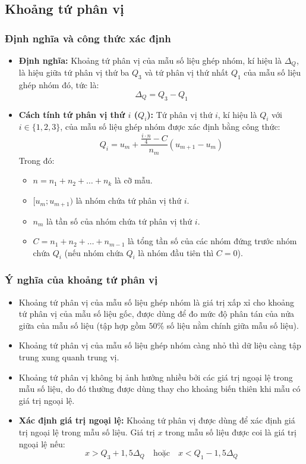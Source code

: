 \documentclass[12pt]{article}
\begin{document}
	
	\subsection{Khoảng tứ phân vị}
	
	\subsubsection{Định nghĩa và công thức xác định}
	\begin{itemize}
		\item \textbf{Định nghĩa:} Khoảng tứ phân vị của mẫu số liệu ghép nhóm, kí hiệu là $\Delta_Q$, là hiệu giữa tứ phân vị thứ ba $Q_3$ và tứ phân vị thứ nhất $Q_1$ của mẫu số liệu ghép nhóm đó, tức là:
		\[ \Delta_Q = Q_3 - Q_1 \]
		
		\item \textbf{Cách tính tứ phân vị thứ $i$ ($Q_i$):} Tứ phân vị thứ $i$, kí hiệu là $Q_i$ với $i \in \{1, 2, 3\}$, của mẫu số liệu ghép nhóm được xác định bằng công thức:
		\[ Q_i = u_m + \frac{\frac{i \cdot n}{4} - C}{n_m}(u_{m+1} - u_m) \]
		Trong đó:
		\begin{itemize}
			\item $n = n_1 + n_2 + \dots + n_k$ là cỡ mẫu.
			\item $[u_m; u_{m+1})$ là nhóm chứa tứ phân vị thứ $i$.
			\item $n_m$ là tần số của nhóm chứa tứ phân vị thứ $i$.
			\item $C = n_1 + n_2 + \dots + n_{m-1}$ là tổng tần số của các nhóm đứng trước nhóm chứa $Q_i$ (nếu nhóm chứa $Q_i$ là nhóm đầu tiên thì $C = 0$).
		\end{itemize}
	\end{itemize}
	
	\subsubsection{Ý nghĩa của khoảng tứ phân vị}
	\begin{itemize}
		\item Khoảng tứ phân vị của mẫu số liệu ghép nhóm là giá trị xấp xỉ cho khoảng tứ phân vị của mẫu số liệu gốc, được dùng để đo mức độ phân tán của nửa giữa của mẫu số liệu (tập hợp gồm $50\%$ số liệu nằm chính giữa mẫu số liệu).
		\item Khoảng tứ phân vị của mẫu số liệu ghép nhóm càng nhỏ thì dữ liệu càng tập trung xung quanh trung vị.
		\item Khoảng tứ phân vị không bị ảnh hưởng nhiều bởi các giá trị ngoại lệ trong mẫu số liệu, do đó thường được dùng thay cho khoảng biến thiên khi mẫu có giá trị ngoại lệ.
		\item \textbf{Xác định giá trị ngoại lệ:} Khoảng tứ phân vị được dùng để xác định giá trị ngoại lệ trong mẫu số liệu. Giá trị $x$ trong mẫu số liệu được coi là giá trị ngoại lệ nếu:
		\[ x > Q_3 + 1,5\Delta_Q \quad \text{hoặc} \quad x < Q_1 - 1,5\Delta_Q \]
	\end{itemize}
	
\end{document}
